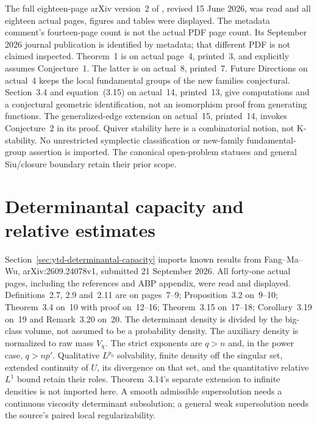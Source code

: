 The full eighteen-page arXiv version~2 of
\cite{BourgetEtAl26IsolatedCoulombV2}, revised 15 June 2026,
was read and all eighteen actual pages, figures and tables were
displayed. The metadata comment's fourteen-page count is not
the actual PDF page count. Its September 2026 journal publication
is identified by metadata; that different PDF is not claimed
inspected. Theorem~1 is on actual page~4, printed~3, and explicitly
assumes Conjecture~1. The latter is on actual~8, printed~7.
Future Directions on actual~4 keeps the local fundamental groups
of the new families conjectural. Section~3.4 and equation~(3.15)
on actual~14, printed~13, give computations and a conjectural
geometric identification, not an isomorphism proof from generating
functions. The generalized-edge extension on actual~15, printed~14,
invokes Conjecture~2 in its proof. Quiver stability here is a
combinatorial notion, not K-stability. No unrestricted symplectic
classification or new-family fundamental-group assertion is imported.
The canonical open-problem statuses and general Siu/closure boundary
retain their prior scope.

\section{Determinantal capacity and relative estimates}
\label{sec:provenance-determinantal-capacity}

Section~\ref{sec:ytd-determinantal-capacity} imports known results
from Fang--Ma--Wu, arXiv:2609.24078v1, submitted 21 September
2026. All forty-one actual pages, including the references and
ABP appendix, were read and displayed. Definitions~2.7, 2.9
and~2.11 are on pages~7--9; Proposition~3.2 on~9--10;
Theorem~3.4 on~10 with proof on~12--16; Theorem~3.15 on~17--18;
Corollary~3.19 on~19 and Remark~3.20 on~20.
The determinant density is divided by the big-class volume,
not assumed to be a probability density. The auxiliary density
is normalized to raw mass $V_\chi$. The strict exponents are
$q>n$ and, in the power case, $q>np'$.
Qualitative $L^{p_0}$ solvability, finite density off the singular
set, extended continuity of $U$, its divergence on that set,
and the quantitative relative $L^1$ bound retain their roles.
Theorem~3.14's separate extension to infinite densities is not
imported here. A smooth admissible supersolution needs a
continuous viscosity determinant subsolution; a general weak
supersolution needs the source's paired local regularizability.

